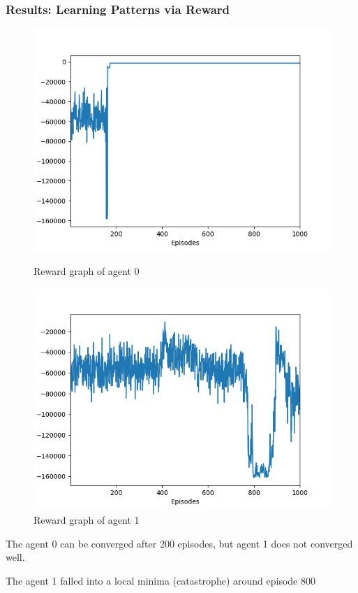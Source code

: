 \documentclass{beamer}
\begin{document}
\begin{frame}
\frametitle{Results: Learning Patterns via Reward}
\begin{figure}
\centering
    \begin{minipage}{.475\textwidth}
    \centering
   \includegraphics[scale=0.25]{presentation/result_1_v1.png}
   \caption{Reward graph of agent 0}
   \end{minipage}
    \begin{minipage}{.475\textwidth}
   \centering
   \includegraphics[scale=0.25]{presentation/result_1_v2.png}
   \caption{Reward graph of agent 1}
   \end{minipage}
\end{figure}
\bit
\item The agent 0 can be converged after 200 episodes, but agent 1 does not converged well. 
\item The agent 1 falled into a local minima (catastrophe) around episode 800
\eit
\end{frame}
\end{document}
